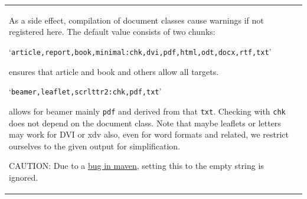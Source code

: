 \begin{longtable}{|ll|}
{\begin{minipage}{0.95\linewidth}
As a side effect, compilation of document classes cause warnings if not registered here. 
The default value consists of two chunks: 
\begin{center}
  `\small{\texttt{article,report,book,minimal:chk,dvi,pdf,html,odt,docx,rtf,txt}}' 
\end{center}
%
ensures that article and book and others allow all targets. 

\begin{center}
  `\small{\texttt{beamer,leaflet,scrlttr2:chk,pdf,txt}}' 
\end{center}
%
allows for beamer mainly \texttt{pdf} and derived from that \texttt{txt}.  
Checking with \texttt{chk} does not depend on the document class. 
Note that maybe leaflets or letters may work for DVI or \gls{xdv} also, even for word formats and related, 
we restrict ourselves to the given output for simplification. 

CAUTION\@: Due to a 
\href{https://issues.apache.org/jira/projects/MNG/issues/MNG-7927?filter=reportedbyme}{bug in maven}, 
setting this to the empty string is ignored. 


\end{minipage}}
\end{longtable}
